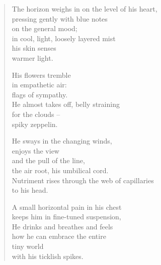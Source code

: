\vspace*{-\baselineskip}
\begin{verse}
The horizon weighs in on the level of his heart,\\
pressing gently with blue notes\\
on the general mood;\\
in cool, light, loosely layered mist\\
his skin senses\\
warmer light.

His flowers tremble\\
in empathetic air:\\
flags of sympathy.\\
He almost takes off, belly straining\\
for the clouds --\\
spiky zeppelin.

He sways in the changing winds,\\
enjoys the view\\
and the pull of the line,\\
the air root, his umbilical cord.\\
Nutriment rises through the web of capillaries\\
to his head.

A small horizontal pain in his chest\\
keeps him in fine-tuned suspension,\\
He drinks and breathes and feels\\
how he can embrace the entire\\
tiny world\\
with his ticklish spikes.
\end{verse}

